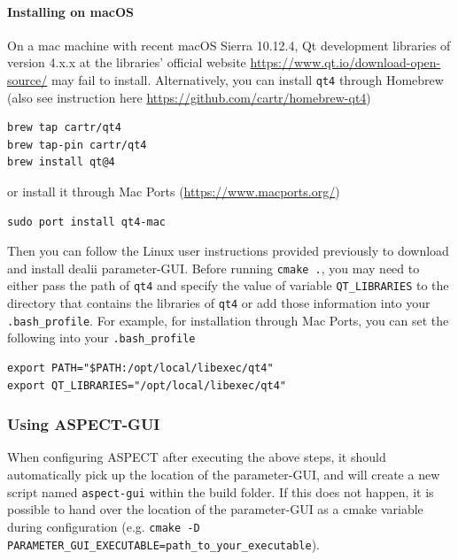 \documentclass{article}
\newcommand{\aspect}{\textsc{ASPECT}}
\begin{document}
\paragraph{Installing on macOS} On a mac machine with recent macOS Sierra 10.12.4, Qt development libraries of version 4.x.x at the libraries' official website \url{https://www.qt.io/download-open-source/} may fail to install.  Alternatively, you can install \texttt{qt4} through Homebrew (also see instruction here \url{https://github.com/cartr/homebrew-qt4})
\begin{verbatim}
brew tap cartr/qt4
brew tap-pin cartr/qt4
brew install qt@4
\end{verbatim}
or install it through Mac Ports (\url{https://www.macports.org/})
\begin{verbatim}
sudo port install qt4-mac
\end{verbatim}
Then you can follow the Linux user instructions provided previously to download and install dealii parameter-GUI. 
Before running \texttt{cmake .}, you may need to either pass the path of \texttt{qt4} and specify the value of variable \texttt{QT\_LIBRARIES} to the directory that contains the libraries of \texttt{qt4}
or add those information into your \texttt{.bash\_profile}. For example, for installation through Mac Ports, you can set the following into your \texttt{.bash\_profile}
\begin{verbatim}
export PATH="$PATH:/opt/local/libexec/qt4"
export QT_LIBRARIES="/opt/local/libexec/qt4"
\end{verbatim}




\subsubsection{Using \aspect{}-GUI}

When configuring \aspect{} after executing the above steps, it should automatically pick up the
location of the parameter-GUI, and will create a new script named \texttt{aspect-gui} within the build folder.
If this does not happen, it is possible to hand over the location of the parameter-GUI as a cmake
variable during configuration (e.g. \texttt{cmake -D PARAMETER\_GUI\_EXECUTABLE=path\_to\_your\_executable}).
\end{document}
